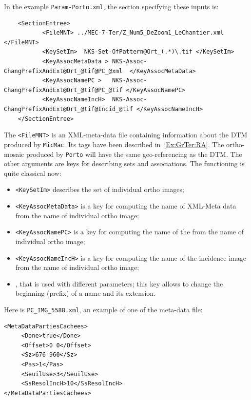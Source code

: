 In the example {\tt Param-Porto.xml}, the section specifying these inputs is:


{\scriptsize
\begin{verbatim}
    <SectionEntree>
           <FileMNT> ../MEC-7-Ter/Z_Num5_DeZoom1_LeChantier.xml </FileMNT>
           <KeySetIm>  NKS-Set-OfPattern@Ort_(.*)\.tif </KeySetIm>
           <KeyAssocMetaData > NKS-Assoc-ChangPrefixAndExt@Ort_@tif@PC_@xml  </KeyAssocMetaData>
           <KeyAssocNamePC >   NKS-Assoc-ChangPrefixAndExt@Ort_@tif@PC_@tif </KeyAssocNamePC>
           <KeyAssocNameIncH>  NKS-Assoc-ChangPrefixAndExt@Ort_@tif@Incid_@tif </KeyAssocNameIncH>
    </SectionEntree>
\end{verbatim}
}

The {\tt <FileMNT>} is an XML-meta-data file containing information about the DTM produced
by {\tt MicMac}. Its tags have been described in~\ref{Ex:GrTer:RA}. The ortho-mosaic produced
by {\tt Porto} will have the same geo-referencing as the DTM. The other arguments are
keys for describing sets and associations. The functioning is quite classical now:

\begin{itemize}
    \item {\tt <KeySetIm>} describes the set of individual ortho images;
    \item {\tt <KeyAssocMetaData>} is a key for computing the name of XML-Meta data from the name of individual ortho image;
    \item {\tt <KeyAssocNamePC>} is a key for computing the name of the  from the name of individual ortho image;
    \item {\tt <KeyAssocNameIncH>} is a key for computing the name of the incidence image from the name of individual ortho image;

    \item {}, that is used with different parameters; this key allows to change the
          beginning (prefix) of a name and its extension.

\end{itemize}

Here is {\tt PC\_IMG\_5588.xml}, an example of one of the meta-data file:


{\scriptsize
\begin{verbatim}
<MetaDataPartiesCachees>
     <Done>true</Done>
     <Offset>0 0</Offset>
     <Sz>676 960</Sz>
     <Pas>1</Pas>
     <SeuilUse>3</SeuilUse>
     <SsResolIncH>10</SsResolIncH>
</MetaDataPartiesCachees>
\end{verbatim}
}

